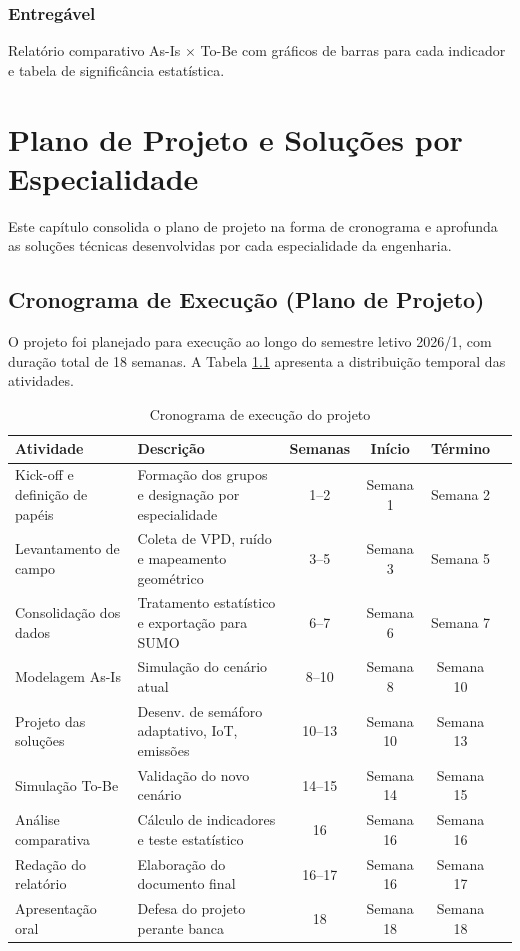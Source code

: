 \documentclass[12pt,a4paper,oneside]{abntex2}
\begin{document}
\subsection{Entregável}

Relatório comparativo As-Is $\times$ To-Be com gráficos de barras para cada indicador e tabela de significância estatística.

\chapter{Plano de Projeto e Soluções por Especialidade}

Este capítulo consolida o plano de projeto na forma de cronograma e aprofunda as soluções técnicas desenvolvidas por cada especialidade da engenharia.

\section{Cronograma de Execução (Plano de Projeto)}

O projeto foi planejado para execução ao longo do semestre letivo 2026/1, com duração total de 18 semanas. A Tabela \ref{tab:cronograma} apresenta a distribuição temporal das atividades.

\begin{table}[H]
\centering
\caption{Cronograma de execução do projeto}
\label{tab:cronograma}
\small
\begin{tabularx}{\textwidth}{p{5cm} X c c c c}
\toprule
\textbf{Atividade} & \textbf{Descrição} & \textbf{Semanas} & \textbf{Início} & \textbf{Término} \\
\midrule
Kick-off e definição de papéis & Formação dos grupos e designação por especialidade & 1--2 & Semana 1 & Semana 2 \\
Levantamento de campo & Coleta de VPD, ruído e mapeamento geométrico & 3--5 & Semana 3 & Semana 5 \\
Consolidação dos dados & Tratamento estatístico e exportação para SUMO & 6--7 & Semana 6 & Semana 7 \\
Modelagem As-Is & Simulação do cenário atual & 8--10 & Semana 8 & Semana 10 \\
Projeto das soluções & Desenv. de semáforo adaptativo, IoT, emissões & 10--13 & Semana 10 & Semana 13 \\
Simulação To-Be & Validação do novo cenário & 14--15 & Semana 14 & Semana 15 \\
Análise comparativa & Cálculo de indicadores e teste estatístico & 16 & Semana 16 & Semana 16 \\
Redação do relatório & Elaboração do documento final & 16--17 & Semana 16 & Semana 17 \\
Apresentação oral & Defesa do projeto perante banca & 18 & Semana 18 & Semana 18 \\
\bottomrule
\end{tabularx}
\end{table}
\end{document}
